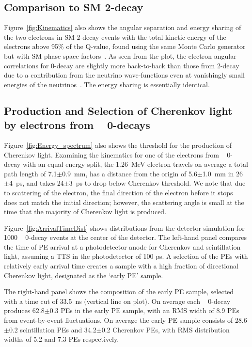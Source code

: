 \subsection{Comparison to SM 2\nbb-decay}
\label{comparison}

Figure~\ref{fig:Kinematics} also shows the angular separation and
energy sharing of the two electrons in SM 2\nbb-decay events with the total kinetic
energy of the electrons above 95\% of the Q-value, found using the
same Monte Carlo generator but with SM phase space
factors~\cite{Jenni}.  As seen from the plot, the electron angular
correlations for 0\nbb-decay are slightly more back-to-back than those
from 2\nbb-decay due to a contribution from the neutrino
wave-functions even at vanishingly small energies of the
neutrinos~\cite{Jenni}. The energy sharing is essentially
identical.

\subsection{Production and Selection 
of Cherenkov light by electrons from \Te~ 0\nbb-decays}
Figure~\ref{fig:Energy_spectrum} also shows the threshold for the
production of Cherenkov light.
Examining the kinematics for one of the electrons from \Te~
0\nbb-decay with an equal energy split, the 1.26~MeV electron travels
on average a total path length of 7.1$\pm$0.9~mm, has a distance from
the origin of 5.6$\pm$1.0~mm in 26 $\pm$4~ps, and takes
24$\pm$3~ps to drop below Cherenkov threshold.  We note that due
to scattering of the electron, the final direction of the electron
before it stops does not match the initial direction; however,
the scattering angle is small at the time that the majority of
Cherenkov light is produced.

Figure~\ref{fig:ArrivalTimeDist} shows distributions from the detector
simulation for 1000 \Te~ 0\nbb-decay events at the center of the
detector. The left-hand panel compares the time of PE
arrival at a photodetector anode for Cherenkov and scintillation
light, assuming a TTS in the
photodetector of 100 ps.  A selection of the PEs with relatively early
arrival time creates a sample with a high fraction of directional
Cherenkov light, designated as the `early PE' sample.

The right-hand panel shows the composition of the early PE sample,
selected with a time cut of 33.5~ns (vertical line on plot). On
average each \Te~ 0\nbb-decay produces 62.8$\pm$0.3 PEs in the early
PE sample, with an RMS width of 8.9 PEs from event-by-event
fluctuations.  On average the early PE sample consists of 28.6$\pm$0.2
scintillation PEs and 34.2$\pm$0.2 Cherenkov PEs, with RMS
distribution widths of 5.2 and 7.3 PEs respectively.


